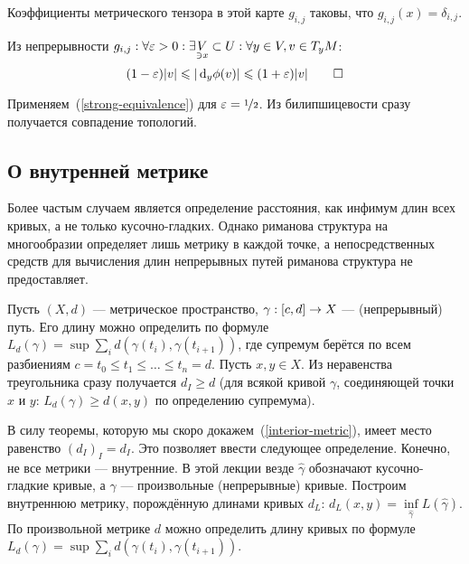 \documentclass[a4paper]{report}
\begin{document}
{{{{        Коэффициенты метрического тензора в этой карте $g_{i,j}$ таковы, что $g_{i,j}(x) = \delta_{i,j}$.

        Из непрерывности $g_{i,j}: \forall \varepsilon > 0:\exists \underset{\ni x}V \subset U: \forall y \in V, v \in T_y M$: \[(1 - \varepsilon)|v| \leqslant |\operatorname{d}\!_y\phi(v)| \leqslant (1 + \varepsilon)|v|\qedhere\]

    }
    }
    \item Применяем~(\cref{strong-equivalence}) для $\varepsilon = \nicefrac{1}{2}$.
        Из билипшицевости сразу получается совпадение топологий.
    }
    }
    \subsection{О внутренней метрике}
    Более частым случаем является определение расстояния, как инфимум длин всех кривых, а не только кусочно-гладких.
    Однако риманова структура на многообразии определяет лишь метрику в каждой точке, а непосредственных средств для вычисления длин непрерывных путей риманова структура не предоставляет.

    Пусть $(X, d)$ --- метрическое пространство, $\gamma: [c, d] \rightarrow X$ --- (непрерывный) путь.
    Его длину можно определить по формуле $L_d(\gamma) = \sup\sum\limits_{i}d(\gamma(t_i), \gamma(t_{i+1}))$, где супремум берётся по всем разбиениям $c = t_0 \le t_1 \le \dots \le t_n = d$.
    Пусть $x, y \in X$.
    Из неравенства треугольника сразу получается $d_I \ge d$ (для всякой кривой $\gamma$, соединяющей точки $x$ и $y$: $L_d(\gamma) \ge d(x, y)$ по определению супремума).

    В силу теоремы, которую мы скоро докажем~(\cref{interior-metric}), имеет место равенство $(d_I)_I = d_I$.
    Это позволяет ввести следующее определение.
    Конечно, не все метрики --- внутренние.
    В этой лекции везде $\hat{\gamma}$ обозначают кусочно-гладкие кривые, а $\gamma$ --- произвольные (непрерывные) кривые.
    Построим внутреннюю метрику, порождённую длинами кривых $d_L$: $d_L(x, y) = \inf\limits_{\hat{\gamma}}L(\hat{\gamma})$.
    По произвольной метрике $d$ можно определить длину кривых по формуле $L_d(\gamma) = \sup\sum\limits_{i}d(\gamma(t_i), \gamma(t_{i+1}))$.
\end{document}
